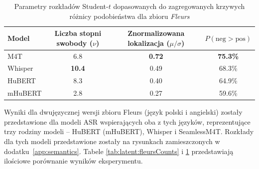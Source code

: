 \begin{table}[!ht]
\centering
\begin{tabular}{lccc}
\hline
Model & Liczba stopni swobody ($\nu$) & Znormalizowana lokalizacja ($\mu/\sigma$) & $P(\text{neg} > \text{pos})$ \\
\hline
M4T    & 6.8 & \textbf{0.72} & \textbf{75.3\%} \\
Whisper   & \textbf{10.4} & 0.49 & 68.3\% \\
HuBERT   & 8.3 & 0.40 & 64.9\% \\
mHuBERT    & 2.8 & 0.27 & 59.6\% \\
\hline
\end{tabular}
\caption{Parametry rozkładów Student-$t$ dopasowanych do zagregowanych krzywych różnicy podobieństwa dla zbioru \textit{Fleurs}}
\label{tab:latent:fleursDist}
\end{table}

Wyniki dla dwujęzycznej wersji zbioru Fleurs (język polski i angielski) zostały przedstawione dla modeli ASR wspierających oba z tych języków, reprezentujące trzy rodziny modeli -- HuBERT (mHuBERT), Whisper i SeamlessM4T. Rozkłady dla tych modeli przedstawione zostały na rysunkach zamieszczonych w dodatku~\ref{app:semantics}. Tabele \ref{tab:latent:fleursCounts} i \ref{tab:latent:fleursDist} przedstawiają ilościowe porównanie wyników eksperymentu.

